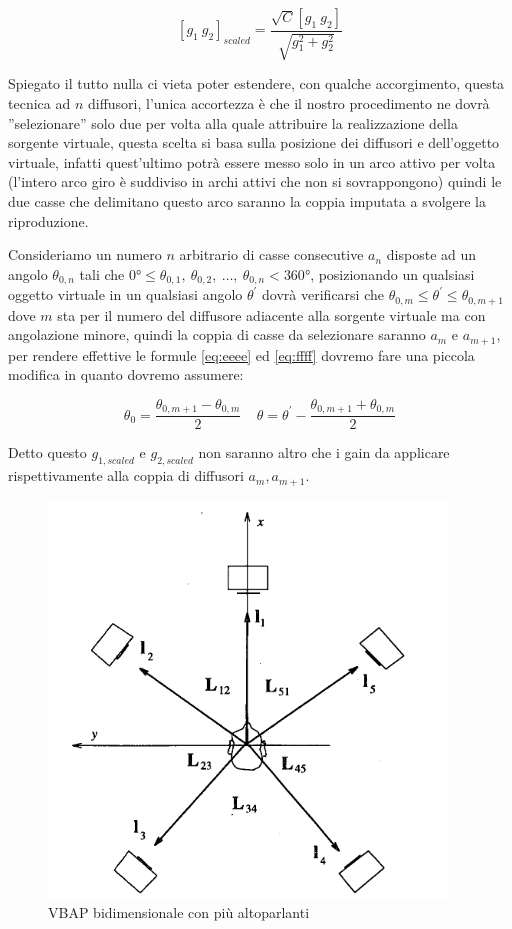 \documentclass[12pt,a4paper]{report}
\begin{document}
\begin{equation}
\left[g_1 \ g_2\right]_{scaled} = \dfrac{\sqrt{C} \left[ g_1 \ g_2 \right]}{\sqrt{g_1^2 + g_2^2}}
\label{eq:ffff}
\end{equation}

Spiegato il tutto nulla ci vieta poter estendere, con qualche accorgimento, questa tecnica ad $n$ diffusori, l'unica accortezza è che il nostro procedimento ne dovrà ''selezionare'' solo due per volta alla quale attribuire la realizzazione della sorgente virtuale, questa scelta si basa sulla posizione dei diffusori e dell'oggetto virtuale, infatti quest'ultimo potrà essere messo solo in un arco attivo per volta (l'intero arco giro è suddiviso in archi attivi che non si sovrappongono) quindi le due casse che delimitano questo arco saranno la coppia imputata a svolgere la riproduzione.

Consideriamo un numero $n$ arbitrario di casse consecutive $a_n$ disposte ad un angolo $\theta_{0,n}$ tali che $0°\leq \theta_{0,1},\ \theta_{0,2},\ \ldots,\ \theta_{0,n} <360°$, posizionando un qualsiasi oggetto virtuale in un qualsiasi angolo $\theta^{\prime}$ dovrà verificarsi che $\theta_{0,m}\leq \theta^{\prime} \leq \theta_{0,m+1}$ dove $m$ sta per il numero del diffusore adiacente alla sorgente virtuale ma con angolazione minore, quindi la coppia di casse da selezionare saranno $a_m$ e $a_{m+1}$, per rendere effettive le formule \ref{eq:eeee} ed \ref{eq:ffff} dovremo fare una piccola modifica in quanto dovremo assumere:

\begin{equation}
\theta_0 = \dfrac{\theta_{0,m+1}-\theta_{0,m}}{2} \ \ \ \ \ \theta=\theta^{\prime}-\dfrac{\theta_{0,m+1}+\theta_{0,m}}{2}
\label{phidiverso}
\end{equation}

Detto questo $g_{1,scaled}$ e $g_{2,scaled}$ non saranno altro che i gain da applicare rispettivamente alla coppia di diffusori $a_{m} , a_{m+1}$.
 \begin{figure}[htbp]
	\centering
	\includegraphics[scale=0.55]{figures/matrix5-1.png}
	\caption {VBAP bidimensionale con più altoparlanti}
	\label{fig:angoli5}
	\end{figure}
\end{document}
